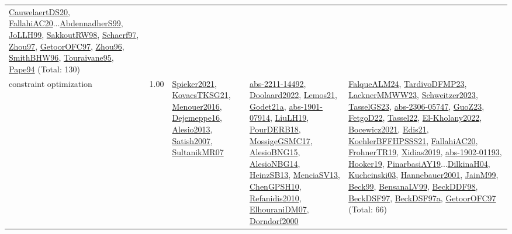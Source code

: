 {\begin{longtable}{p{3cm}r>{\raggedright\arraybackslash}p{6cm}>{\raggedright\arraybackslash}p{6cm}>{\raggedright\arraybackslash}p{8cm}}
\hyperref[detail:CauwelaertDS20]{CauwelaertDS20}, \hyperref[detail:FallahiAC20]{FallahiAC20}...\hyperref[detail:AbdennadherS99]{AbdennadherS99}, \hyperref[detail:JoLLH99]{JoLLH99}, \hyperref[detail:SakkoutRW98]{SakkoutRW98}, \hyperref[detail:Schaerf97]{Schaerf97}, \hyperref[detail:Zhou97]{Zhou97}, \hyperref[detail:GetoorOFC97]{GetoorOFC97}, \hyperref[detail:Zhou96]{Zhou96}, \hyperref[detail:SmithBHW96]{SmithBHW96}, \hyperref[detail:Touraivane95]{Touraivane95}, \hyperref[detail:Pape94]{Pape94} (Total: 130)\\
\index{constraint optimization}\index{CP!constraint optimization}constraint optimization &  1.00 & \hyperref[detail:Spieker2021]{Spieker2021}, \hyperref[detail:KovacsTKSG21]{KovacsTKSG21}, \hyperref[detail:Menouer2016]{Menouer2016}, \hyperref[detail:Dejemeppe16]{Dejemeppe16}, \hyperref[detail:Alesio2013]{Alesio2013}, \hyperref[detail:Satish2007]{Satish2007}, \hyperref[detail:SultanikMR07]{SultanikMR07} & \hyperref[detail:abs-2211-14492]{abs-2211-14492}, \hyperref[detail:Doolaard2022]{Doolaard2022}, \hyperref[detail:Lemos21]{Lemos21}, \hyperref[detail:Godet21a]{Godet21a}, \hyperref[detail:abs-1901-07914]{abs-1901-07914}, \hyperref[detail:LiuLH19]{LiuLH19}, \hyperref[detail:PourDERB18]{PourDERB18}, \hyperref[detail:MossigeGSMC17]{MossigeGSMC17}, \hyperref[detail:AlesioBNG15]{AlesioBNG15}, \hyperref[detail:AlesioNBG14]{AlesioNBG14}, \hyperref[detail:HeinzSB13]{HeinzSB13}, \hyperref[detail:MenciaSV13]{MenciaSV13}, \hyperref[detail:ChenGPSH10]{ChenGPSH10}, \hyperref[detail:Refanidis2010]{Refanidis2010}, \hyperref[detail:ElhouraniDM07]{ElhouraniDM07}, \hyperref[detail:Dorndorf2000]{Dorndorf2000} & \hyperref[detail:FalqueALM24]{FalqueALM24}, \hyperref[detail:TardivoDFMP23]{TardivoDFMP23}, \hyperref[detail:LacknerMMWW23]{LacknerMMWW23}, \hyperref[detail:Schweitzer2023]{Schweitzer2023}, \hyperref[detail:TasselGS23]{TasselGS23}, \hyperref[detail:abs-2306-05747]{abs-2306-05747}, \hyperref[detail:GuoZ23]{GuoZ23}, \hyperref[detail:FetgoD22]{FetgoD22}, \hyperref[detail:Tassel22]{Tassel22}, \hyperref[detail:El-Kholany2022]{El-Kholany2022}, \hyperref[detail:Bocewicz2021]{Bocewicz2021}, \hyperref[detail:Edis21]{Edis21}, \hyperref[detail:KoehlerBFFHPSSS21]{KoehlerBFFHPSSS21}, \hyperref[detail:FallahiAC20]{FallahiAC20}, \hyperref[detail:FrohnerTR19]{FrohnerTR19}, \hyperref[detail:Xidias2019]{Xidias2019}, \hyperref[detail:abs-1902-01193]{abs-1902-01193}, \hyperref[detail:Hooker19]{Hooker19}, \hyperref[detail:PinarbasiAY19]{PinarbasiAY19}...\hyperref[detail:DilkinaH04]{DilkinaH04}, \hyperref[detail:Kuchcinski03]{Kuchcinski03}, \hyperref[detail:Hannebauer2001]{Hannebauer2001}, \hyperref[detail:JainM99]{JainM99}, \hyperref[detail:Beck99]{Beck99}, \hyperref[detail:BensanaLV99]{BensanaLV99}, \hyperref[detail:BeckDDF98]{BeckDDF98}, \hyperref[detail:BeckDSF97]{BeckDSF97}, \hyperref[detail:BeckDSF97a]{BeckDSF97a}, \hyperref[detail:GetoorOFC97]{GetoorOFC97} (Total: 66)\\

\end{longtable}}

